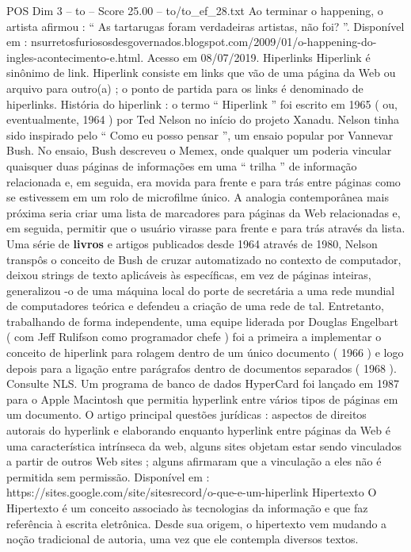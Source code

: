 \begin{textsample}{POS Dim 3 – to – Score 25.00 – to/to\_ef\_28.txt}
Ao terminar o happening, o artista afirmou : “ As tartarugas foram verdadeiras artistas, não foi? ”.
Disponível em : nsurretosfuriososdesgovernados.blogspot.com/2009/01/o-happening-do-ingles-acontecimento-e.html.
Acesso em 08/07/2019.
Hiperlinks Hiperlink é sinônimo de link.
Hiperlink consiste em links que vão de uma página da Web ou arquivo para outro(a) ; o ponto de partida para os links é denominado de hiperlinks.
História do hiperlink : o termo “ Hiperlink ” foi escrito em 1965 ( ou, eventualmente, 1964 ) por Ted Nelson no início do projeto Xanadu.
Nelson tinha sido inspirado pelo “ Como eu posso pensar ”, um ensaio popular por Vannevar Bush.
No ensaio, Bush descreveu o Memex, onde qualquer um poderia vincular quaisquer duas páginas de informações em uma “ trilha ” de informação relacionada e, em seguida, era movida para frente e para trás entre páginas como se estivessem em um rolo de microfilme único.
A analogia contemporânea mais próxima seria criar uma lista de marcadores para páginas da Web relacionadas e, em seguida, permitir que o usuário virasse para frente e para trás através da lista.
Uma série de \textbf{livros} e artigos publicados desde 1964 através de 1980, Nelson transpôs o conceito de Bush de cruzar automatizado no contexto de computador, deixou strings de texto aplicáveis às específicas, em vez de páginas inteiras, generalizou -o de uma máquina local do porte de secretária a uma rede mundial de computadores teórica e defendeu a criação de uma rede de tal.
Entretanto, trabalhando de forma independente, uma equipe liderada por Douglas Engelbart ( com Jeff Rulifson como programador chefe ) foi a primeira a implementar o conceito de hiperlink para rolagem dentro de um único documento ( 1966 ) e logo depois para a ligação entre parágrafos dentro de documentos separados ( 1968 ).
Consulte NLS.
Um programa de banco de dados HyperCard foi lançado em 1987 para o Apple Macintosh que permitia hyperlink entre vários tipos de páginas em um documento.
O artigo principal questões jurídicas : aspectos de direitos autorais do hyperlink e elaborando enquanto hyperlink entre páginas da Web é uma característica intrínseca da web, alguns sites objetam estar sendo vinculados a partir de outros Web sites ; alguns afirmaram que a vinculação a eles não é permitida sem permissão.
Disponível em : https://sites.google.com/site/sitesrecord/o-que-e-um-hiperlink Hipertexto O Hipertexto é um conceito associado às tecnologias da informação e que faz referência à escrita eletrônica.
Desde sua origem, o hipertexto vem mudando a noção tradicional de autoria, uma vez que ele contempla diversos textos.

\end{textsample}
